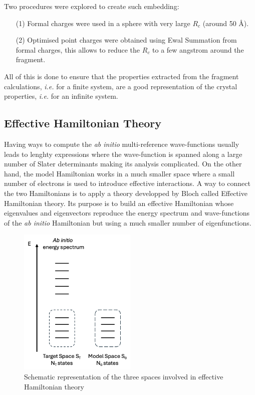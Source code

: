 \documentclass[12pt]{report}
\numberwithin{equation}{section}
\begin{document}
Two procedures were explored to create such embedding:
\begin{itemize}
    \item[(1)] Formal charges were used in a sphere with very large $R_c$ (around 50 \AA{}).
    \item[(2)] Optimised point charges were obtained using Ewal Summation from formal charges, this allows to reduce the $R_c$ to a few angstrom around the fragment.
\end{itemize}

All of this is done to ensure that the properties extracted from the fragment calculations, \textit{i.e.} for a finite system, are a good representation of the crystal properties, \textit{i.e.} for an infinite system.

\subsection{Effective Hamiltonian Theory}

Having ways to compute the \textit{ab initio} multi-reference wave-functions usually leads to lenghty expressions where the wave-function is spanned along a large number of Slater determinants making its analysis complicated.
On the other hand, the model Hamiltonian works in a much smaller space where a small number of electrons is used to introduce effective interactions.
A way to connect the two Hamiltonians is to apply a theory developped by Bloch called Effective Hamiltonian theory. 
Its purpose is to build an effective Hamiltonian whose eigenvalues and eigenvectors reproduce the energy spectrum and wave-functions of the \textit{ab initio} Hamiltonian but using a much smaller number of eigenfunctions.

\begin{figure}[!ht]
    \centering
    \includegraphics[width=0.5\textwidth]{Images/HEFF.schema.png}
    \caption{Schematic representation of the three spaces involved in effective Hamiltonian theory}
    \label{fig:Heff}
\end{figure}
\end{document}
